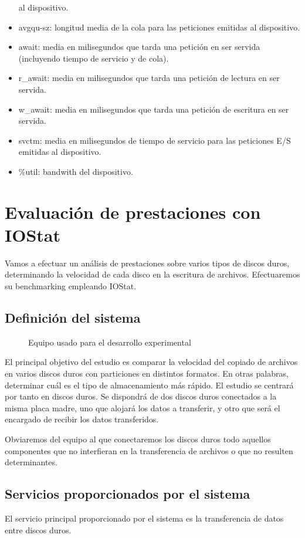 \documentclass[a4paper,10pt]{article}
\newcommand{\imagent}[5]{
  \begin{figure}
    \begin{center}
    \texttt{[image: \#1]}
    \end{center}
    \caption{#3}
    \label{#4}
  \end{figure}
}
\renewcommand{\texttt}[2][black!60]{\textcolor{#1}{\ttfamily #2}}
\begin{document}
\begin{itemize}
 al dispositivo.
 \item{\texttt{avgqu-sz}}: longitud media de la cola para las peticiones emitidas al dispositivo.
 \item{\texttt{await}}: media en milisegundos que tarda una petición en ser servida (incluyendo tiempo de servicio y de cola).
 \item{\texttt{r\_await}}: media en milisegundos que tarda una petición de lectura en ser servida.
 \item{\texttt{w\_await}}: media en milisegundos que tarda una petición de escritura en ser servida.
 \item{\texttt{svctm}}: media en milisegundos de tiempo de servicio para las peticiones E/S emitidas al dispositivo.
 \item{\texttt{\%util}}: bandwith del dispositivo.
\end{itemize}

\section{Evaluación de prestaciones con IOStat}
Vamos a efectuar un análisis de prestaciones sobre varios tipos de discos duros, determinando la velocidad de cada 
disco en la escritura de archivos. Efectuaremos su benchmarking empleando IOStat.

\subsection{Definición del sistema}
\imagent{system.jpg}{r}{Equipo usado para el desarrollo experimental}{system}{0.6}El principal objetivo del estudio es comparar la velocidad del copiado de archivos en varios discos duros con particiones
en distintos formatos. En otras palabras, determinar cuál es el tipo de almacenamiento más rápido. El estudio se centrará
por tanto en discos duros. Se dispondrá de dos discos duros conectados a la misma placa madre, uno que alojará los datos a
transferir, y otro que será el encargado de recibir los datos transferidos.

Obviaremos del equipo al que conectaremos los discos duros todo aquellos componentes que no interfieran en la transferencia 
de archivos o que no resulten determinantes.

\subsection{Servicios proporcionados por el sistema}
El servicio principal proporcionado por el sistema es la transferencia de datos entre discos duros.
\end{document}
